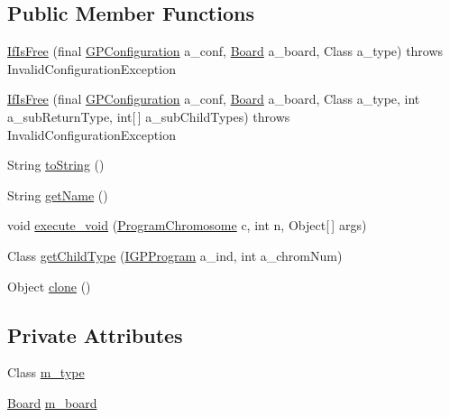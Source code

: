 \subsection*{Public Member Functions}
\begin{DoxyCompactItemize}
\item 
\hyperlink{classexamples_1_1gp_1_1tictactoe_1_1_if_is_free_aff049fce999893cb1f0b5a9f15cd0a3f}{If\-Is\-Free} (final \hyperlink{classorg_1_1jgap_1_1gp_1_1impl_1_1_g_p_configuration}{G\-P\-Configuration} a\-\_\-conf, \hyperlink{classexamples_1_1gp_1_1tictactoe_1_1_board}{Board} a\-\_\-board, Class a\-\_\-type)  throws Invalid\-Configuration\-Exception 
\item 
\hyperlink{classexamples_1_1gp_1_1tictactoe_1_1_if_is_free_af9c53797fc985cadd644437841856f18}{If\-Is\-Free} (final \hyperlink{classorg_1_1jgap_1_1gp_1_1impl_1_1_g_p_configuration}{G\-P\-Configuration} a\-\_\-conf, \hyperlink{classexamples_1_1gp_1_1tictactoe_1_1_board}{Board} a\-\_\-board, Class a\-\_\-type, int a\-\_\-sub\-Return\-Type, int\mbox{[}$\,$\mbox{]} a\-\_\-sub\-Child\-Types)  throws Invalid\-Configuration\-Exception 
\item 
String \hyperlink{classexamples_1_1gp_1_1tictactoe_1_1_if_is_free_aae49dcef4fdaf7653aaa1171ab1bd97c}{to\-String} ()
\item 
String \hyperlink{classexamples_1_1gp_1_1tictactoe_1_1_if_is_free_aff53b7771d46bf39bee22fe0ec55925b}{get\-Name} ()
\item 
void \hyperlink{classexamples_1_1gp_1_1tictactoe_1_1_if_is_free_aec3c23f9baf9bec46678cb359a3b7928}{execute\-\_\-void} (\hyperlink{classorg_1_1jgap_1_1gp_1_1impl_1_1_program_chromosome}{Program\-Chromosome} c, int n, Object\mbox{[}$\,$\mbox{]} args)
\item 
Class \hyperlink{classexamples_1_1gp_1_1tictactoe_1_1_if_is_free_af6f00dbf98d1cfe26d179c525bdd1d0d}{get\-Child\-Type} (\hyperlink{interfaceorg_1_1jgap_1_1gp_1_1_i_g_p_program}{I\-G\-P\-Program} a\-\_\-ind, int a\-\_\-chrom\-Num)
\item 
Object \hyperlink{classexamples_1_1gp_1_1tictactoe_1_1_if_is_free_a324fd630db9ca78c5b2c07b5bf1363cb}{clone} ()
\end{DoxyCompactItemize}
\subsection*{Private Attributes}
\begin{DoxyCompactItemize}
\item 
Class \hyperlink{classexamples_1_1gp_1_1tictactoe_1_1_if_is_free_abc952d10b71af2ecc76aea823fa42f1a}{m\-\_\-type}
\item 
\hyperlink{classexamples_1_1gp_1_1tictactoe_1_1_board}{Board} \hyperlink{classexamples_1_1gp_1_1tictactoe_1_1_if_is_free_a0114d222769e96e765d2fc978a793cb0}{m\-\_\-board}
\end{DoxyCompactItemize}
